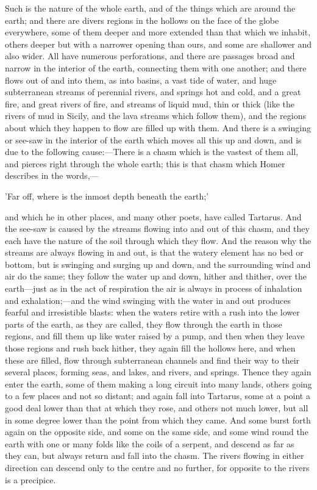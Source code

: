 Such is the nature of the whole earth, and of the things which are around
the earth; and there are divers regions in the hollows on the face of the
globe everywhere, some of them deeper and more extended than that which we
inhabit, others deeper but with a narrower opening than ours, and some are
shallower and also wider. All have numerous perforations, and there are
passages broad and narrow in the interior of the earth, connecting them
with one another; and there flows out of and into them, as into basins, a
vast tide of water, and huge subterranean streams of perennial rivers, and
springs hot and cold, and a great fire, and great rivers of fire, and
streams of liquid mud, thin or thick (like the rivers of mud in Sicily,
and the lava streams which follow them), and the regions about which they
happen to flow are filled up with them. And there is a swinging or see-saw
in the interior of the earth which moves all this up and down, and is due
to the following cause:—There is a chasm which is the vastest of
them all, and pierces right through the whole earth; this is that chasm
which Homer describes in the words,—

'Far off, where is the inmost depth beneath the earth;'

and which he in other places, and many other poets, have called Tartarus.
And the see-saw is caused by the streams flowing into and out of this
chasm, and they each have the nature of the soil through which they flow.
And the reason why the streams are always flowing in and out, is that the
watery element has no bed or bottom, but is swinging and surging up and
down, and the surrounding wind and air do the same; they follow the water
up and down, hither and thither, over the earth—just as in the act
of respiration the air is always in process of inhalation and exhalation;—and
the wind swinging with the water in and out produces fearful and
irresistible blasts: when the waters retire with a rush into the lower
parts of the earth, as they are called, they flow through the earth in
those regions, and fill them up like water raised by a pump, and then when
they leave those regions and rush back hither, they again fill the hollows
here, and when these are filled, flow through subterranean channels and
find their way to their several places, forming seas, and lakes, and
rivers, and springs. Thence they again enter the earth, some of them
making a long circuit into many lands, others going to a few places and
not so distant; and again fall into Tartarus, some at a point a good deal
lower than that at which they rose, and others not much lower, but all in
some degree lower than the point from which they came. And some burst
forth again on the opposite side, and some on the same side, and some wind
round the earth with one or many folds like the coils of a serpent, and
descend as far as they can, but always return and fall into the chasm. The
rivers flowing in either direction can descend only to the centre and no
further, for opposite to the rivers is a precipice.

